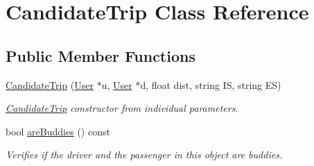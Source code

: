 \hypertarget{class_candidate_trip}{}\section{Candidate\+Trip Class Reference}
\label{class_candidate_trip}
\subsection*{Public Member Functions}
\begin{DoxyCompactItemize}
\item 
\hyperlink{group___candidate_trip_gad9ecdfcf0d01c7d88a92a132a7f3bc67}{Candidate\+Trip} (\hyperlink{class_user}{User} $\ast$u, \hyperlink{class_user}{User} $\ast$d, float dist, string IS, string ES)
\begin{DoxyCompactList}\small\item\em \hyperlink{class_candidate_trip}{Candidate\+Trip} constructor from individual parameters. \end{DoxyCompactList}\item 
bool \hyperlink{group___candidate_trip_ga5857725c938706a05eddef0102bf9456}{are\+Buddies} () const
\begin{DoxyCompactList}\small\item\em Verifies if the driver and the passenger in this object are buddies. \end{DoxyCompactList}\end{DoxyCompactItemize}
